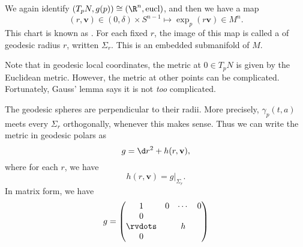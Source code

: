 \documentclass[a4paper]{article}
\begin{document}
We again identify $(T_p N, g(p)) \cong (\R^n, \mathrm{eucl})$, and then we have a map
\[
  (r, \mathbf{v}) \in (0, \delta) \times S^{n - 1} \mapsto \exp_p (r\mathbf{v}) \in M^n.
\]
This chart is known as . For each fixed $r$, the image of this map is called a  of geodesic radius $r$, written $\Sigma_r$. This is an embedded submanifold of $M$.

Note that in geodesic local coordinates, the metric at $0 \in T_p N$ is given by the Euclidean metric. However, the metric at other points can be complicated. Fortunately, Gauss' lemma says it is not \emph{too} complicated.

\begin{thm}
  The geodesic spheres are perpendicular to their radii. More precisely, $\gamma_p(t, a)$ meets every $\Sigma_r$ orthogonally, whenever this makes sense. Thus we can write the metric in geodesic polars as
  \[
    g = \d r^2 + h(r, \mathbf{v}),
  \]
  where for each $r$, we have
  \[
    h(r, \mathbf{v}) = g|_{\Sigma_r}.
  \]
  In matrix form, we have
  \[
    g =
    \begin{pmatrix}
      1 & 0 & \cdots & 0\\
      0\\
      \rvdots & & h\\
      0
    \end{pmatrix}
  \]
\end{thm}
\end{document}
